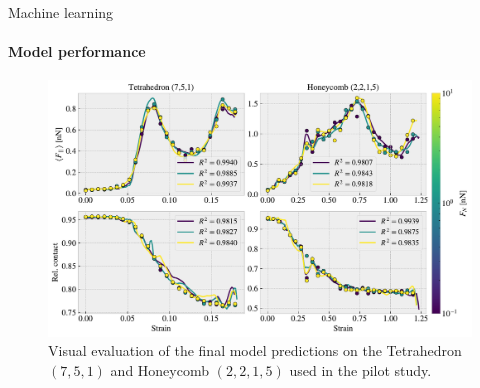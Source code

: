 \documentclass[
	10pt, %
]{beamer}
\begin{document}
%
%
\begin{frame}{Machine learning}
	\framesubtitle{Model performance}
	\begin{figure}[H]
		\centering
		\includegraphics[width=0.8\linewidth]{../figures/final_model_evaluation_slide.pdf}
		\caption{Visual evaluation of the final model predictions on the Tetrahedron $(7,5,1)$ and Honeycomb $(2,2,1,5)$ used in the pilot study.}
	\end{figure}  

\end{frame}
%
%
\end{document}
